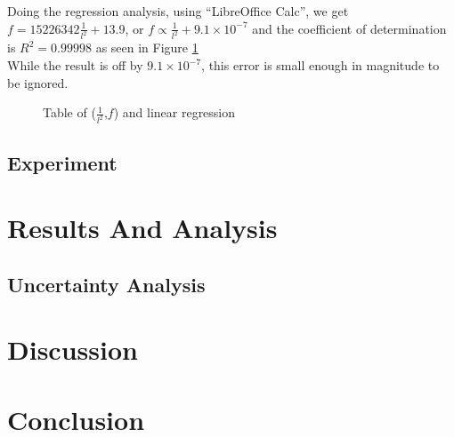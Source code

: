 \documentclass[a4paper,12pt]{article}
\begin{document}
    Doing the regression analysis, using ``LibreOffice Calc'', we get $f=15226342\frac{1}{l^{2}}+13.9$, or $f\propto\frac{1}{l^{2}}+9.1\times10^{-7}$ and the coefficient of determination is $R^{2}=0.99998$ as seen in Figure \ref{fig:regression}\\
    While the result is off by $9.1\times10^{-7}$, this error is small enough in magnitude to be ignored.
    \begin{figure}[H]%
    \begin{center}

    \caption{Table of ($\frac{1}{l^{2}}$,$f$) and linear regression}\label{fig:regression}
    \end{center}
    \end{figure}




    \subsection{Experiment}\label{Experiment}%
\section{Results And Analysis}\label{ResultsAnalysis}%
    \subsection{Uncertainty Analysis}
\section{Discussion}%
\section{Conclusion}%

\pagebreak
{}
\printbibliography
\end{document}
